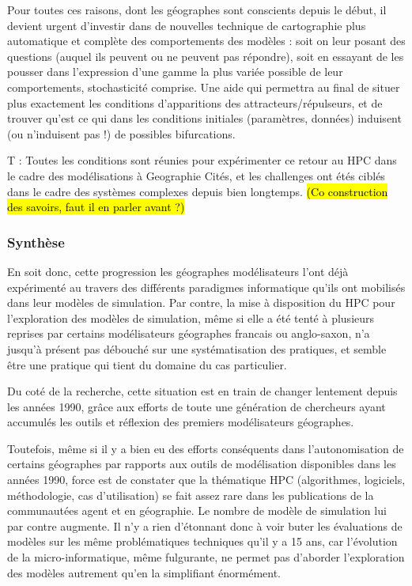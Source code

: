 Pour toutes ces raisons, dont les géographes sont conscients depuis le début, il devient urgent d'investir dans de nouvelles technique de cartographie plus automatique et complète des comportements des modèles : soit on leur posant des questions (auquel ils peuvent ou ne peuvent pas répondre), soit en essayant de les pousser dans l'expression d'une gamme la plus variée possible de leur comportements, stochasticité comprise. Une aide qui permettra au final de situer plus exactement les conditions d'apparitions des attracteurs/répulseurs, et de trouver qu'est ce qui dans les conditions initiales (paramètres, données) induisent (ou n'induisent pas !) de possibles bifurcations.


T : Toutes les conditions sont réunies pour expérimenter ce retour au HPC dans le cadre des modélisations à Geographie Cités, et les challenges ont étés ciblés dans le cadre des systèmes complexes depuis bien longtemps. \hl{(Co construction des savoirs, faut il en parler avant ?)}

\subsubsection{Synthèse}
\label{sssec:synthese}


En soit donc, cette progression les géographes modélisateurs l'ont déjà expérimenté au travers des différents paradigmes informatique qu'ils ont mobilisés dans leur modèles de simulation. Par contre, la mise à disposition du HPC pour l'exploration des modèles de simulation, même si elle a été tenté à plusieurs reprises par certains modélisateurs géographes francais ou anglo-saxon, n'a jusqu'à présent pas débouché sur une systématisation des pratiques, et semble être une pratique qui tient du domaine du cas particulier.


Du coté de la recherche, cette situation est en train de changer lentement depuis les années 1990, grâce aux efforts de toute une génération de chercheurs ayant accumulés les outils et réflexion des premiers modélisateurs géographes.

Toutefois, même si il y a bien eu des efforts conséquents dans l'autonomisation de certains géographes par rapports aux outils de modélisation disponibles dans les années 1990, force est de constater que la thématique HPC (algorithmes, logiciels, méthodologie, cas d'utilisation) se fait assez rare dans les publications de la communautées agent et en géographie. Le nombre de modèle de simulation lui par contre augmente. Il n'y a rien d'étonnant donc à voir buter les évaluations de modèles sur les même problématiques techniques qu'il y a 15 ans, car l'évolution de la micro-informatique, même fulgurante, ne permet pas d'aborder l'exploration des modèles autrement qu'en la simplifiant énormément.

